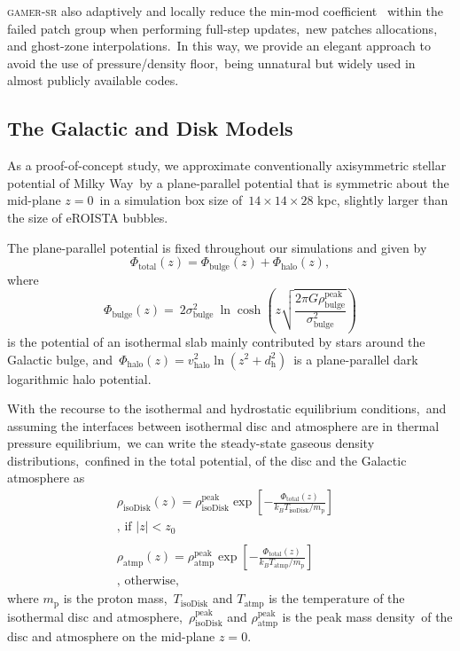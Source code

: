 \documentclass[twocolumn]{aastex631}
\begin{document}
  \textsc{gamer-sr} also adaptively and locally reduce the min-mod coefficient\
  \citep{tseng2021} within the failed patch group when performing full-step updates,\
  new patches allocations, and ghost-zone interpolations.\
  In this way, we provide an elegant approach to avoid the use of pressure/density floor,\
  being unnatural but widely used in almost publicly available codes.\

  \subsection{The Galactic and Disk Models}
  As a proof-of-concept study, we approximate conventionally axisymmetric stellar potential of Milky Way\
  by a plane-parallel potential that is symmetric about the mid-plane $z=0$\
  in a simulation box size of\
  $14\times14\times28$ kpc, slightly larger than the size of eROISTA bubbles.

  The plane-parallel potential is fixed throughout our simulations and given by
  \begin{equation}
    \Phi_{\text{total}}(z) = \Phi_{\text{bulge}}(z) + \Phi_{\text{halo}}(z),
  \end{equation}
  where
  \begin{equation}
    \Phi_{\text{bulge}}(z)=\
    2\sigma^2_{\text{bulge}}\
    \ln\cosh\left(z\sqrt{\frac{2\pi G\rho_{\text{bulge}}^{\text{peak}}}{\sigma^2_{\text{bulge}}}}\right)
  \end{equation}
  is the potential of an isothermal slab mainly contributed by stars around the Galactic bulge, and\
  $\Phi_{\text{halo}}(z)=v^2_{\text{halo}}\ln\left(z^2+d^2_{\text{h}}\right)$\
  is a plane-parallel dark logarithmic halo potential.

  With the recourse to the isothermal and hydrostatic equilibrium conditions,\
  and assuming the interfaces between isothermal disc and atmosphere are in thermal pressure equilibrium,\
  we can write the steady-state gaseous density distributions,\
  confined in the total potential, of the disc and the Galactic atmosphere as\
  \begin{subequations}
  \begin{align}
     \displaystyle \rho_{\text{isoDisk}}(z) = \rho_{\text{isoDisk}}^{\text{peak}}
     \exp\left[-\frac{\Phi_{\text{total}}(z)}{k_{B}T_{\text{isoDisk}}/m_{\text{p}}}\right]&\label{isothermal-disc-density}\\
     \text{, if $|z| < z_{0}$}& \nonumber \\
     \nonumber\\
     \displaystyle \rho_{\text{atmp}}(z) = \rho_{\text{atmp}}^{\text{peak}}
     \exp\left[-\frac{\Phi_{\text{total}}(z)}{k_{B}T_{\text{atmp}}/m_{\text{p}}}\right]&\label{isothermal-atmp-density}\\
     \text{, otherwise,}& \nonumber
  \end{align}
  \label{disc-atm-sys}
  \end{subequations}
  where $m_{\text{p}}$ is the proton mass,\
  $T_{\text{isoDisk}}$ and $T_{\text{atmp}}$ is the temperature of the isothermal disc and atmosphere,\
  $\rho_{\text{isoDisk}}^{\text{peak}}$ and $\rho_{\text{atmp}}^{\text{peak}}$ is the peak mass density\
  of the disc and atmosphere on the mid-plane $z=0$.
\end{document}
